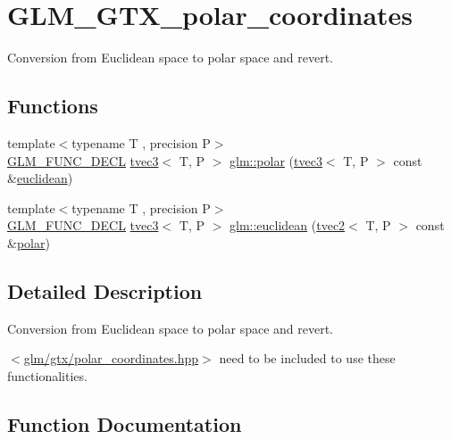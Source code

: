 \hypertarget{group__gtx__polar__coordinates}{}\section{G\+L\+M\+\_\+\+G\+T\+X\+\_\+polar\+\_\+coordinates}
\label{group__gtx__polar__coordinates}


Conversion from Euclidean space to polar space and revert.  


\subsection*{Functions}
\begin{DoxyCompactItemize}
\item 
{\footnotesize template$<$typename T , precision P$>$ }\\\mbox{\hyperlink{setup_8hpp_ab2d052de21a70539923e9bcbf6e83a51}{G\+L\+M\+\_\+\+F\+U\+N\+C\+\_\+\+D\+E\+CL}} \mbox{\hyperlink{structglm_1_1tvec3}{tvec3}}$<$ T, P $>$ \mbox{\hyperlink{group__gtx__polar__coordinates_gafcf95a38c780a4ad5ba14c8ac9e522bb}{glm\+::polar}} (\mbox{\hyperlink{structglm_1_1tvec3}{tvec3}}$<$ T, P $>$ const \&\mbox{\hyperlink{group__gtx__polar__coordinates_ga45ece1fbf7260c43e0f873c498202581}{euclidean}})
\item 
{\footnotesize template$<$typename T , precision P$>$ }\\\mbox{\hyperlink{setup_8hpp_ab2d052de21a70539923e9bcbf6e83a51}{G\+L\+M\+\_\+\+F\+U\+N\+C\+\_\+\+D\+E\+CL}} \mbox{\hyperlink{structglm_1_1tvec3}{tvec3}}$<$ T, P $>$ \mbox{\hyperlink{group__gtx__polar__coordinates_ga45ece1fbf7260c43e0f873c498202581}{glm\+::euclidean}} (\mbox{\hyperlink{structglm_1_1tvec2}{tvec2}}$<$ T, P $>$ const \&\mbox{\hyperlink{group__gtx__polar__coordinates_gafcf95a38c780a4ad5ba14c8ac9e522bb}{polar}})
\end{DoxyCompactItemize}


\subsection{Detailed Description}
Conversion from Euclidean space to polar space and revert. 

$<$\mbox{\hyperlink{polar__coordinates_8hpp}{glm/gtx/polar\+\_\+coordinates.\+hpp}}$>$ need to be included to use these functionalities. 

\subsection{Function Documentation}
\mbox{\label{group__gtx__polar__coordinates_ga45ece1fbf7260c43e0f873c498202581}} 
